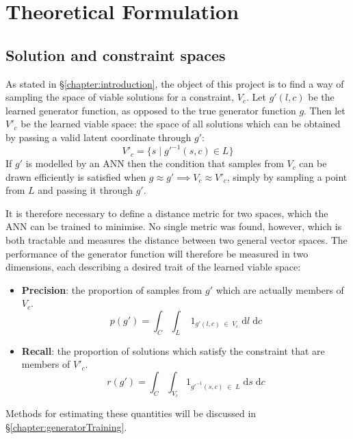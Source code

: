 \documentclass[../../main.tex]{subfiles}
\begin{document}
\chapter{Theoretical Formulation} \label{chapter:theoreticalFormulation}

\section{Solution and constraint spaces} \label{section:solutionAndConstraintSpaces}

As stated in \S\ref{chapter:introduction}, the object of this project is to find a way of sampling the space of viable solutions for a constraint, $V_c$.
Let $g'(l,c)$ be the learned generator function, as opposed to the true generator function $g$.
Then let $V'_c$ be the learned viable space: the space of all solutions which can be obtained by passing a valid latent coordinate through $g'$:
\begin{equation}
	V'_c=\{s\;|\;g'^{-1}(s,c)\in L\}
\end{equation}
If $g'$ is modelled by an ANN then the condition that samples from $V_c$ can be drawn efficiently is satisfied when $g\approx g'\implies V_c\approx V'_c$, simply by sampling a point from $L$ and passing it through $g'$.

It is therefore necessary to define a distance metric for two spaces, which the ANN can be trained to minimise.
No single metric was found, however, which is both tractable and measures the distance between two general vector spaces.
The performance of the generator function will therefore be measured in two dimensions, each describing a desired trait of the learned viable space:
\begin{itemize}
    \item[] \textbf{Precision}: the proportion of samples from $g'$ which are actually members of $V_c$.
	\begin{equation}
		p(g')=\int_{C}\int_{L}\;1_{g'(l, c)\;\in\;V_c}\;\mathrm{d}l\;\mathrm{d}c
	\end{equation}
    \item[] \textbf{Recall}: the proportion of solutions which satisfy the constraint that are members of $V'_c$.
	\begin{equation}
		r(g')=\int_{C}\int_{V_c}1_{g'^{-1}(s,c)\;\in\;L}\;\mathrm{d}s\;\mathrm{d}c
	\end{equation}
\end{itemize}
Methods for estimating these quantities will be discussed in \S\ref{chapter:generatorTraining}.
\end{document}

